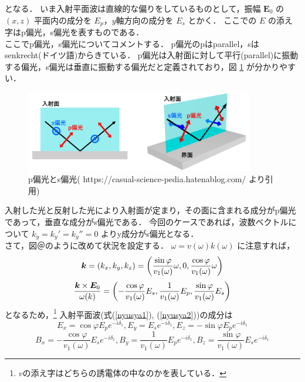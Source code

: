 \documentclass{jsarticle}
\numberwithin{equation}{section}
\theoremstyle{definition}
\begin{document}
となる．
いま入射平面波は直線的な偏りをしているものとして，振幅 $\bm{E}_0$ の $(x, z)$ 平面内の成分を $E_p$，$y$軸方向の成分を $E_s$ とかく．
ここでの $E$ の添え字はp偏光，s偏光を表すものである．\\
\quad ここでp偏光，s偏光についてコメントする．
p偏光のpはparallel，sはsenkrecht(ドイツ語)からきている．
p偏光は入射面に対して平行(parallel)に振動する偏光，s偏光は垂直に振動する偏光だと定義されており，図 \ref{henko} が分かりやすい．
\begin{figure}[H]
    \begin{center}
    \includegraphics[width=10cm]{henko_ps.png}
    \end{center}
    \caption{p偏光とs偏光( https://casual-science-pedia.hatenablog.com/ より引用)}
    \label{henko}
\end{figure}
入射した光と反射した光により入射面が定まり，その面に含まれる成分がp偏光であって，垂直な成分がs偏光である．
今回のケースであれば，波数ベクトルについて $k_y = k_y' = k_y'' = 0$ よりy成分がs偏光となる．\\
\quad さて，図＠のように改めて状況を設定する．
$\omega = v (\omega) k (\omega)$ に注意すれば，
\begin{equation}
    \bm{k} = (k_x, k_y, k_z) = \qty(\frac{\sin \varphi }{v_1 (\omega)} \omega, 0, \frac{\cos \varphi }{v_1 (\omega)} \omega)
\end{equation}
\begin{equation}
    \frac{\bm{k} \times \bm{E}_0}{\omega (k)} = \qty(-\frac{\cos \varphi }{v_1 (\omega)} E_s, \frac{1}{v_1 (\omega)}E_p, \frac{\sin \varphi }{v_1 (\omega)} E_s)
\end{equation}
となるため，\footnote{$v$の添え字はどちらの誘電体の中なのかを表している．} 入射平面波(式(\ref{nyusya1}), (\ref{nyusya2}))の成分は
\begin{equation}
    E_x = \cos \varphi E_p e^{-i \delta_1}, E_y = E_s e^{-i \delta_1}, E_z = - \sin \varphi E_p e^{-i \delta_1} 
\end{equation}
\begin{equation}
    B_x = -\frac{\cos \varphi }{v_1 (\omega)} E_s e^{-i \delta_1}, B_y = \frac{1}{v_1 (\omega)}E_p e^{-i \delta_1}, B_z = \frac{\sin \varphi }{v_1 (\omega)} E_s e^{-i \delta_1}
\end{equation}
\end{document}
